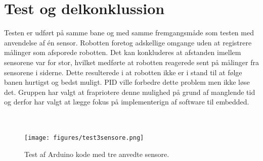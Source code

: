 \section{Test og delkonklussion}
Testen er udført på samme bane og med samme fremgangsmåde som testen med anvendelse af én sensor. Robotten foretog adskellige omgange uden at registrere målinger som afsporede robotten. Det kan konkluderes at afstanden imellem sensorene var for stor, hvilket medførte at robotten reagerede sent på målinger fra sensorene i siderne. Dette resulterede i at robotten ikke er i stand til at følge banen hurtigst og bedst muligt. 
PID ville forbedre dette problem men ikke løse det. Gruppen har valgt at frapriotere denne mulighed på grund af manglende tid og derfor har valgt at lægge fokus på implementerign af software til embedded. 
\\
\\
\\
\begin{figure}[h!]
  \centering
  \texttt{[image: figures/test3sensore.png]}
  \caption{Test af Arduino kode med tre anvedte sensore.}
  \label{test_3_sensore}
\end{figure}




